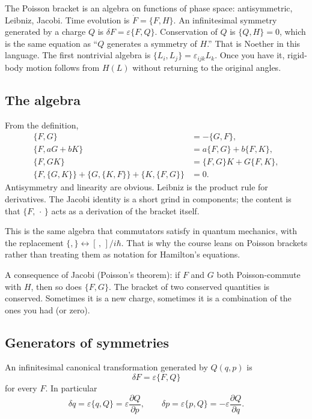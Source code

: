 \documentclass[11pt]{article}
\numberwithin{equation}{section}
\newcommand{\pd}[2]{\frac{\partial #1}{\partial #2}}
\begin{document}
The Poisson bracket is an algebra on functions of phase space: antisymmetric, Leibniz, Jacobi. Time evolution is $\dot F=\{F,H\}$. An infinitesimal symmetry generated by a charge $Q$ is $\delta F=\varepsilon\{F,Q\}$. Conservation of $Q$ is $\{Q,H\}=0$, which is the same equation as ``$Q$ generates a symmetry of $H$.'' That is Noether in this language. The first nontrivial algebra is $\{L_i,L_j\}=\varepsilon_{ijk}L_k$. Once you have it, rigid-body motion follows from $H(L)$ without returning to the original angles.

\subsection{The algebra}

From the definition,
\begin{align}
\{F,G\} &= -\{G,F\}, \label{eq:PBanti}\\
\{F,aG+bK\} &= a\{F,G\}+b\{F,K\}, \nonumber\\
\{F,GK\} &= \{F,G\}K + G\{F,K\}, \label{eq:PBleibniz}\\
\{F,\{G,K\}\} + \{G,\{K,F\}\} + \{K,\{F,G\}\} &= 0. \label{eq:PBjacobi}
\end{align}
Antisymmetry and linearity are obvious. Leibniz is the product rule for derivatives. The Jacobi identity is a short grind in components; the content is that $\{F,\,\cdot\,\}$ acts as a derivation of the bracket itself.

This is the same algebra that commutators satisfy in quantum mechanics, with the replacement $\{,\}\leftrightarrow [\, ,\,]/i\hbar$. That is why the course leans on Poisson brackets rather than treating them as notation for Hamilton's equations.

A consequence of Jacobi (Poisson's theorem): if $F$ and $G$ both Poisson-commute with $H$, then so does $\{F,G\}$. The bracket of two conserved quantities is conserved. Sometimes it is a new charge, sometimes it is a combination of the ones you had (or zero).

\subsection{Generators of symmetries}

An infinitesimal canonical transformation generated by $Q(q,p)$ is
\[
\delta F = \varepsilon\{F,Q\}
\]
for every $F$. In particular
\[
\delta q = \varepsilon\{q,Q\} = \varepsilon\pd{Q}{p},\qquad
\delta p = \varepsilon\{p,Q\} = -\varepsilon\pd{Q}{q}.
\]
\end{document}
